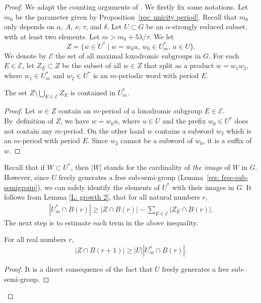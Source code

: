 \begin{proof}
We adapt the counting arguments of \cite{coulon_growth_2013}.
We firstly fix some notations.
Let $m_0$ be the parameter given by Proposition~\ref{res: unicity period}.
Recall that $m_0$ only depends on $\alpha$, $A$, $\nu$, $\tau$, and $\delta$.
Let $U \subset G$ be an $\alpha$-strongly reduced subset, with at least two elements.
Let $m > m_0 + 5 \lambda/\tau$.
We let
\[
Z=\{ w\in U^* \mid w= w_0u ,\, w_0\in U^*_m ,\, u\in U\}.
\]
We denote by $\mathcal{E}$ the set of all maximal loxodromic subgroups in $G$.
For each $E \in \mathcal E$, let $Z_E\subset Z$ be the subset of all $w\in Z$ that split as a product $w=w_1w_2$, where $w_1 \in U^*_m$ and $w_2\in U^*$ is an $m$-periodic word with period $E$.

\begin{lem}\label{L: growth 2}
The set $Z\setminus \bigcup_{E\in \mathcal{E}}Z_E $ is contained in $U^*_m$.
\end{lem}
\begin{proof}
Let $w\in Z$ contain an $m$-period of a loxodromic subgroup $E \in \mathcal E$.
By~definition of $Z$, we have $w=w_0u$, where $u \in U$ and the prefix $w_0\in U^*$ does not contain any $m$-period.
On the other hand $w$ contains a subword $w_2$ which is an $m$-period with period $E$.
Since $w_2$ cannot be a subword of $w_0$, it is a suffix of $w$.
\end{proof}

Recall that if $W \subset U^*$, then $|W|$ stands for the cardinality of \emph{the image} of $W$ in $G$.
However, since $U$ freely generates a free sub-semi-group (Lemma~\ref{res: free-sub-semigroup}), we can safely identify the elements of $U^*$ with their images in $G$.
It follows from Lemma \ref{L: growth 2}, that for all natural numbers $r$,\vspace*{-3pt}
\begin{align}
\label{I: growth 1}
|U^*_m\cap B(r)| \geqslant |Z\cap B(r)| - \sum_{E\in \mathcal{E}} |Z_E \cap B(r)| .
\end{align}
The next step is to estimate each term in the above inequality.

\begin{lem} \label{I: growth 2}
For all real numbers $r$,\vspace*{-3pt}
\[
|Z\cap B(r+1)| \geqslant |U| |U^*_m \cap B(r)| .
\]
\end{lem}

\begin{proof}
It is a direct consequence of the fact that $U$ freely generates a free sub-semi-group.
\end{proof}


\end{proof}
